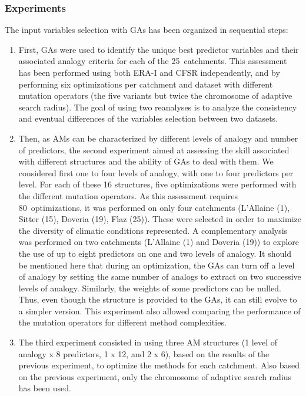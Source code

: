 \documentclass[draft]{agujournal2019}
\begin{document}
\subsubsection{Experiments}
\label{experiments}

The input variables selection with GAs has been organized in sequential steps:

\begin{enumerate}
	\item First, GAs were used to identify the unique best predictor variables and their associated analogy criteria for each of the 25~catchments. This assessment has been performed using both ERA-I and CFSR independently, and by performing six optimizations per catchment and dataset with different mutation operators (the five variants but twice the chromosome of adaptive search radius). The goal of using two reanalyses is to analyze the consistency and eventual differences of the variables selection between two datasets.
	\item Then, as AMs can be characterized by different levels of analogy and number of predictors, the second experiment aimed at assessing the skill associated with different structures and the ability of GAs to deal with them. We considered first one to four levels of analogy, with one to four predictors per level. For each of these 16 structures, five optimizations were performed with the different mutation operators. As this assessment requires 80~optimizations, it was performed on only four catchments (L'Allaine (1), Sitter (15), Doveria (19), Flaz (25)). These were selected in order to maximize the diversity of climatic conditions represented. A complementary analysis was performed on two catchments (L'Allaine (1) and Doveria (19)) to explore the use of up to eight predictors on one and two levels of analogy. It should be mentioned here that during an optimization, the GAs can turn off a level of analogy by setting the same number of analogs to extract on two successive levels of analogy. Similarly, the weights of some predictors can be nulled. Thus, even though the structure is provided to the GAs, it can still evolve to a simpler version. This experiment also allowed comparing the performance of the mutation operators for different method complexities.
	\item The third experiment consisted in using three AM structures (1 level of analogy x 8 predictors, 1 x 12, and 2 x 6), based on the results of the previous experiment, to optimize the methods for each catchment. Also based on the previous experiment, only the chromosome of adaptive search radius has been used.\\

\end{enumerate}
\end{document}
